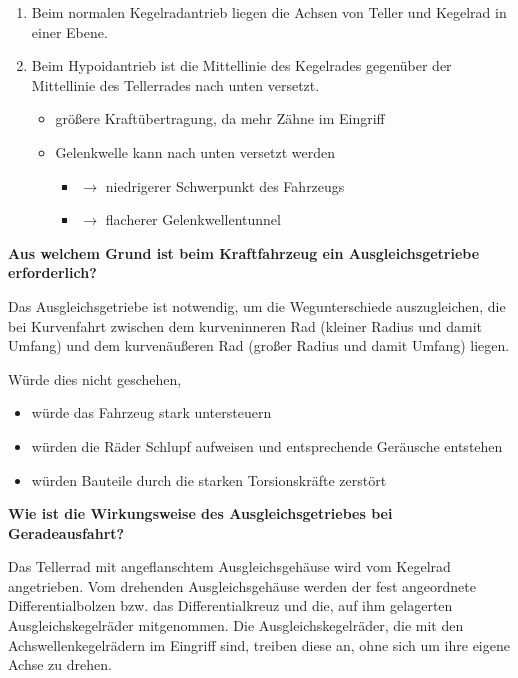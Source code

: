 \begin{enumerate}
\item
  Beim normalen Kegelradantrieb liegen die Achsen von Teller und
  Kegelrad in einer Ebene.
\item
  Beim Hypoidantrieb ist die Mittellinie des Kegelrades gegenüber der
  Mittellinie des Tellerrades nach unten versetzt.

  \begin{itemize}
  \item
    größere Kraftübertragung, da mehr Zähne im Eingriff
  \item
    Gelenkwelle kann nach unten versetzt werden

    \begin{itemize}
    \item
      $\to$ niedrigerer Schwerpunkt des Fahrzeugs
    \item
      $\to$ flacherer Gelenkwellentunnel
    \end{itemize}
  \end{itemize}
\end{enumerate}

\textbf{Aus welchem Grund ist beim Kraftfahrzeug ein Ausgleichsgetriebe
erforderlich?}

Das Ausgleichsgetriebe ist notwendig, um die Wegunterschiede
auszugleichen, die bei Kurvenfahrt zwischen dem kurveninneren Rad
(kleiner Radius und damit Umfang) und dem kurvenäußeren Rad (großer
Radius und damit Umfang) liegen.

Würde dies nicht geschehen,

\begin{itemize}
\item
  würde das Fahrzeug stark untersteuern
\item
  würden die Räder Schlupf aufweisen und entsprechende Geräusche
  entstehen
\item
  würden Bauteile durch die starken Torsionskräfte zerstört
\end{itemize}

\textbf{Wie ist die Wirkungsweise des Ausgleichsgetriebes bei
Geradeausfahrt?}

Das Tellerrad mit angeflanschtem Ausgleichsgehäuse wird vom Kegelrad
angetrieben. Vom drehenden Ausgleichsgehäuse werden der fest angeordnete
Differentialbolzen bzw. das Differentialkreuz und die, auf ihm
gelagerten Ausgleichskegelräder mitgenommen. Die Ausgleichskegelräder,
die mit den Achswellenkegelrädern im Eingriff sind, treiben diese an,
ohne sich um ihre eigene Achse zu drehen.

